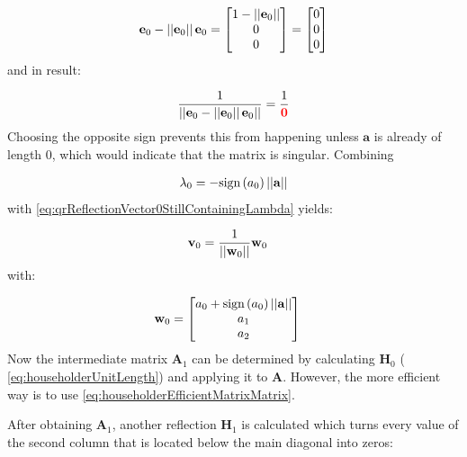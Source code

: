 \begin{align}
\mathbf{e}_0 - \left\vert\left\vert\mathbf{e}_0\right\vert\right\vert\mathbf{e}_0 
=
\begin{bmatrix}
1 - \left\vert\left\vert\mathbf{e}_0\right\vert\right\vert\\
0\\
0
\end{bmatrix}
=
\begin{bmatrix}
0\\
0\\
0 
\end{bmatrix}
\end{align}
%
and in result:

\begin{align}
\frac{1}{\left\vert\left\vert\mathbf{e}_0 - \left\vert\left\vert\mathbf{e}_0\right\vert\right\vert\mathbf{e}_0\right\vert\right\vert} = \frac{1}{\color{red}{\mathbf{0}}}
\end{align}
%
Choosing the opposite sign prevents this from happening unless $\mathbf{a}$ is already of length 0, which would indicate that the matrix is singular.
Combining 


\begin{align}
\lambda_0 = -\textrm{sign}\left(a_0\right) \left\vert\left\vert\mathbf{a}\right\vert\right\vert
\end{align}
%
with \cref{eq:qrReflectionVector0StillContainingLambda} yields:



\begin{align}
\mathbf{v}_0 
&=
\frac{1}{\left\vert\left\vert\mathbf{w}_0\right\vert\right\vert}\mathbf{w}_0
\end{align}
%
with:

\begin{align}
\mathbf{w}_0 
&=
\begin{bmatrix}
a_0 + \textrm{sign}\left(a_0\right) \left\vert\left\vert\mathbf{a}\right\vert\right\vert\\
a_1\\
a_2
\end{bmatrix}
\end{align}
%
Now the intermediate matrix $\mathbf{A}_1$ can be determined by calculating $\mathbf{H}_0$ ( \cref{eq:householderUnitLength}) and applying it to $\mathbf{A}$.
However, the more efficient way is to use \cref{eq:householderEfficientMatrixMatrix}.

After obtaining $\mathbf{A}_1$, another reflection $\mathbf{H}_1$ is calculated which turns every value of the second column that is located below the main diagonal into zeros:

